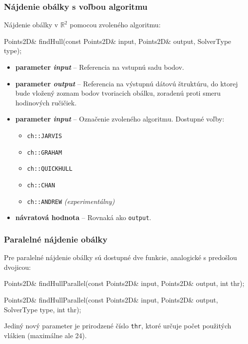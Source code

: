 \documentclass[a4paper, 12pt, slovak]{article}
\begin{document}
\subsubsection{Nájdenie obálky s voľbou algoritmu}

Nájdenie obálky v $\mathbb{R}^2$ pomocou zvoleného algoritmu:

\begin{c++}
Points2D& findHull(const Points2D& input, Points2D& output, SolverType type);
\end{c++}

\begin{itemize}
 \item \textbf{parameter \textit{input}} -- Referencia na vstupnú sadu bodov. 
 \item \textbf{parameter \textit{output}} -- Referencia na výstupnú dátovú 
štruktúru, do ktorej bude vložený zoznam bodov tvoriacich obálku, zoradenú proti 
smeru hodinových ručičiek.
 \item \textbf{parameter \textit{input}} -- Označenie zvoleného algoritmu. Dostupné 
voľby:
\begin{itemize}
 \item \texttt{ch::JARVIS}
 \item \texttt{ch::GRAHAM}
 \item \texttt{ch::QUICKHULL}
 \item \texttt{ch::CHAN}
 \item \texttt{ch::ANDREW} \emph{(experimentálny)}
\end {itemize}
 \item \textbf{návratová hodnota} -- Rovnaká ako \texttt{output}.

\end {itemize}

\subsubsection{Paralelné nájdenie obálky}
Pre paralelné nájdenie obálky sú dostupné dve funkcie, analogické s predošlou 
dvojicou:

\begin{c++}
Points2D& findHullParallel(const Points2D& input, Points2D& output, int thr);

Points2D& findHullParallel(const Points2D& input, Points2D& output, 
    SolverType type, int thr);
\end{c++}

Jediný nový parameter je prirodzené číslo \texttt{thr}, ktoré určuje počet použitých 
vlákien (maximálne ale 24).
\pagebreak
\end{document}

